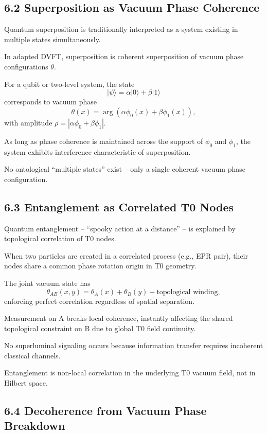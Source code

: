 \documentclass[12pt,a4paper]{article}
\begin{document}
	\subsection{6.2 Superposition as Vacuum Phase Coherence}
	
	Quantum superposition is traditionally interpreted as a system existing in multiple states simultaneously.
	
	In adapted DVFT, superposition is coherent superposition of vacuum phase configurations $\theta$.
	
	For a qubit or two-level system, the state
	\[
	|\psi\rangle = \alpha |0\rangle + \beta |1\rangle
	\]
	corresponds to vacuum phase
	\[
	\theta(x) = \arg(\alpha \phi_0(x) + \beta \phi_1(x)),
	\]
	with amplitude $\rho = |\alpha \phi_0 + \beta \phi_1|$.
	
	As long as phase coherence is maintained across the support of $\phi_0$ and $\phi_1$, the system exhibits interference characteristic of superposition.
	
	No ontological ``multiple states'' exist – only a single coherent vacuum phase configuration.
	
	\subsection{6.3 Entanglement as Correlated T0 Nodes}
	
	Quantum entanglement – ``spooky action at a distance'' – is explained by topological correlation of T0 nodes.
	
	When two particles are created in a correlated process (e.g., EPR pair), their nodes share a common phase rotation origin in T0 geometry.
	
	The joint vacuum state has
	\[
	\theta_{AB}(x,y) = \theta_A(x) + \theta_B(y) + \text{topological winding},
	\]
	enforcing perfect correlation regardless of spatial separation.
	
	Measurement on A breaks local coherence, instantly affecting the shared topological constraint on B due to global T0 field continuity.
	
	No superluminal signaling occurs because information transfer requires incoherent classical channels.
	
	Entanglement is non-local correlation in the underlying T0 vacuum field, not in Hilbert space.
	
	\subsection{6.4 Decoherence from Vacuum Phase Breakdown}
	
\end{document}
